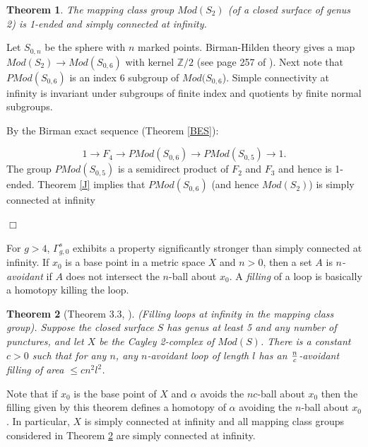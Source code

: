 \documentclass[12pt]{article}
\newtheorem{theorem}{Theorem}[subsection]
\newenvironment{proof}{\addvspace{12pt}\noindent{\bf Proof:}}{
$\Box$\par\addvspace{12pt}}
\begin{document}
 \begin{theorem} \label{DM1} 
 The mapping class group $Mod(S_2)$ (of a closed surface of genus 2) is 1-ended and simply connected at infinity. 
 \end{theorem}
 \begin{proof}
 Let $S_{0,n}$ be the sphere with $n$ marked points.
Birman-Hilden theory gives a map $Mod(S_2) \to Mod(S_{0,6})$ with kernel $\mathbb Z/2$ (see page 257 of \cite{FM12}).
Next note that $PMod(S_{0,6})$ is an index 6 subgroup of $Mod(S_{0,6}$).  Simple connectivity at infinity is invariant under subgroups of finite index and quotients by finite normal subgroups.

By the Birman exact sequence (Theorem \ref{BES}): 

$$1 \to F_4 \to PMod(S_{0,6}) \to PMod(S_{0,5}) \to 1.$$
 The group $PMod(S_{0,5})$ is a semidirect product of $F_2$ and $F_3$ and hence is 1-ended.  Theorem \ref{J} implies that 
  $PMod(S_{0,6})$ (and hence $Mod(S_2)$) is simply connected at infinity
 \end{proof} 
 
 
For $g>4$, $\Gamma_{g,0}^s$ exhibits a property significantly stronger than simply connected at infinity. If $x_0$ is a base point in a metric space $X$ and $n>0$, then a set $A$ is {\it $n$-avoidant} if $A$ does not intersect the $n$-ball about $x_0$. A {\it filling} of a loop is basically a homotopy killing the loop. 
  
 \begin{theorem} [Theorem 3.3, \cite{ABDDY12}] \label{FillingL}(Filling loops at infinity in the mapping class group). Suppose the closed surface $S$ has
genus at least 5 and any number of punctures, and let $X$ be the Cayley 2-complex
of $Mod(S)$. There is a constant $c > 0$ such that for any $n$, any $n$-avoidant loop of
length $l$ has an $n\over c$-avoidant filling of area $\leq  cn^2l^2$.
\end{theorem}
Note that if $x_0$ is the base point of $X$ and $\alpha$ avoids the $nc$-ball about $x_0$ then the filling given by this theorem defines a homotopy of $\alpha$ avoiding the $n$-ball about $x_0$. In particular, $X$ is simply connected at infinity and all mapping class groups considered in Theorem \ref{FillingL} are simply connected at infinity. 
\end{document}
